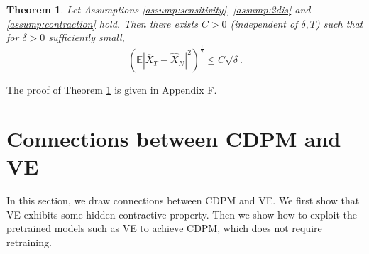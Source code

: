 \documentclass[letterpaper,10pt,reqno]{amsart}
\def\eqref#1{(\ref{#1})}
\newtheorem{theorem}{Theorem}
\numberwithin{equation}{section}
\begin{document}
\begin{theorem}
\label{thm:globalerr}
Let Assumptions \ref{assump:sensitivity}, \ref{assump:2dis} and \ref{assump:contraction} hold.
Then there exists $C > 0$ (independent of $\delta, T$) such that
for $\delta >0$ sufficiently small,
\begin{equation}
\label{eq:globalerr}
\left(\mathbb{E}|\overline{X}_T - \widehat{X}_N|^2 \right)^{\frac{1}{2}} \le C \sqrt{\delta}.
\end{equation}
\end{theorem}

\quad The proof of Theorem \ref{thm:globalerr} is given in Appendix F. 



\section{Connections between CDPM and VE}
\label{sc35}
\quad In this section, we draw connections between CDPM and VE.
We first show that VE exhibits some hidden contractive property. 
Then we show how to exploit the pretrained models such as VE 
to achieve CDPM, which does not require retraining. 
\end{document}
